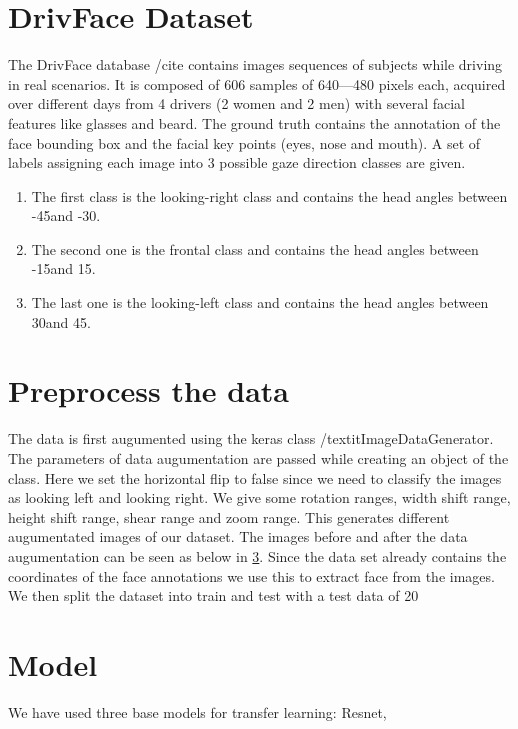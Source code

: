 \documentclass[a4paper, 12pt, oneside, BCOR1cm,toc=chapterentrywithdots]{scrbook}
\begin{document}
\section{DrivFace Dataset}

The DrivFace database /cite{} contains images sequences of subjects while driving in real scenarios. It is composed of 606 samples of 640—480 pixels each, acquired over different days from 4 drivers (2 women and 2 men) with several facial features like glasses and beard. The ground truth contains the annotation of the face bounding box and the facial key points (eyes, nose and mouth). A set of labels assigning each image into 3 possible gaze direction classes are given.

\begin{enumerate}
	\item The first class is the looking-right class and contains the head angles between -45\degree and -30\degree.
	\item The second one is the frontal class and contains the head angles between -15\degree and 15\degree.
	\item The last one is the looking-left class and contains the head angles between 30\degree and 45\degree.
\end{enumerate}
 

\section{Preprocess the data}

The data is first augumented using the keras class /textit{ImageDataGenerator}. The parameters of data augumentation are passed while creating an object of the class. Here we set the horizontal flip to false since we need to classify the images as looking left and looking right. We give some rotation ranges, width shift range, height shift range, shear range and zoom range. This generates different augumentated images of our dataset. The images before and after the data augumentation can be seen as below in \ref{}. Since the data set already contains the coordinates of the face annotations we use this to extract face from the images. We then split the dataset into train and test with a test data of 20%

\section{Model}

We have used three base models for transfer learning: Resnet, 
\end{document}
